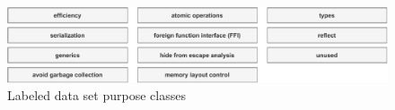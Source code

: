 \begin{figure}[ht!]
    \includegraphics[width=\textwidth]{assets/figures/chapter4/purpose-labels.pdf}
    \caption{Labeled data set purpose classes}
    \label{fig:purpose-labels}
\end{figure}
